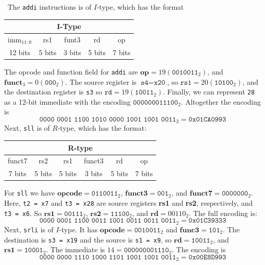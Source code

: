 \documentclass[12pt]{article}
\newenvironment{sol}[1][Solution]{\begin{trivlist}
		\item[\hskip \labelsep {\bfseries #1:}]}{\end{trivlist}}
\begin{document}
\begin{sol}
	\
	The \texttt{addi} instructions is of $I$-type, which has the format
	\begin{center}
		\begin{tabular}{|c|c|c|c|c|}
			\multicolumn{5}{c}{I-Type}\\
			\hline
			$\text{imm}_{11:0}$ & rs1 & funt3 & rd & op\\
			\hline
			12 bits & 5 bits & 3 bits & 5 bits & 7 bits\\
			\hline
		\end{tabular}
	\end{center}
	The opcode and function field for
	\texttt{addi} are $\textbf{op}=19(\texttt{0010011}_2)$, and  
	$\textbf{funct}_3=0(\texttt{000}_2)$. The source register is $\texttt{s4}=\texttt{x20}$,
	so $\texttt{rs1} = 20 (\texttt{10100}_2)$, and the destination register is
	\texttt{s3} so $\texttt{rd}=19(\texttt{10011}_2)$. Finally, we can represent
	\texttt{28} as a 12-bit immediate with the encoding $\texttt{000000011100}_2$.
	Altogether the encoding is
	\[\texttt{0000 0001 1100 1010 0000 1001 1001 0011}_2=\texttt{0x01CA0993}\]
	Next, \texttt{sll} is of $R$-type, which has the format:
	\begin{center}
		\begin{tabular}{|c|c|c|c|c|c|}
			\multicolumn{6}{c}{R-type}\\
			\hline
			funct7 & rs2 & rs1 & funct3 & rd & op\\
			\hline
			7 bits & 5 bits & 5 bits & 3 bits & 5 bits & 7 bits\\
			\hline
		\end{tabular}
	\end{center}
	For \texttt{sll} we have $\textbf{opcode}=\texttt{0110011}_2$,
	$\textbf{funct3}=\texttt{001}_2$, and $\textbf{funct7}=\texttt{0000000}_2$.
	Here, \texttt{t2 = x7} and \texttt{t3 = x28} are source registers \textbf{rs1}
	and \textbf{rs2}, respectively, and \texttt{t3 = x6}. So $\textbf{rs1}=\texttt{00111}_2$, $\textbf{rs2}=\texttt{11100}_2$, and $\textbf{rd}=\text{00110}_2$. The full
	encoding is:
	\[
	\texttt{0000 0001 1100 0011 1001 0011 0011 0011}_2=\texttt{0x01C39333}
	\]
	Next, \texttt{srli} is of $I$-type. It has $\textbf{opcode}=\texttt{0010011}_2$ and
	$\textbf{func3}=\texttt{101}_2$. The destination is \texttt{s3 = x19} and
	the source is \texttt{s1 = x9}, so $\textbf{rd}=\texttt{10011}_2$, and
	$\textbf{rs1}=\texttt{10001}_2$. The immediate is $14=\texttt{000000001110}_2$. The
	encoding is
	\[
	\texttt{0000 0000 1110 1000 1101 1001 1001 0011}_2=\texttt{0x00E8D993}
\]
\end{sol}
\end{document}
